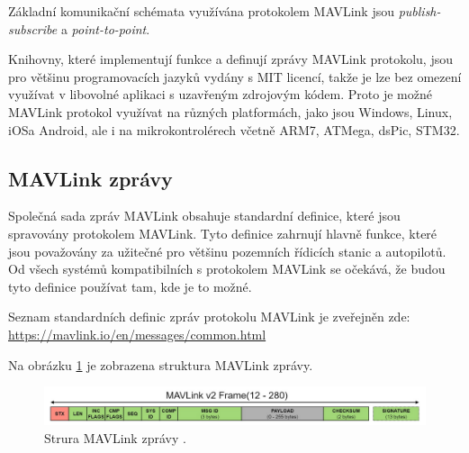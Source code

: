 Základní komunikační schémata využívána protokolem MAVLink jsou \textit{publish-subscribe} a \textit{point-to-point}.

Knihovny, které implementují funkce a definují zprávy MAVLink protokolu, jsou pro většinu programovacích jazyků vydány s MIT licencí, takže je lze bez omezení využívat v libovolné aplikaci s uzavřeným zdrojovým kódem. Proto je možné MAVLink protokol využívat na různých platformách, jako jsou Windows, Linux, iOS\break a Android, ale i na mikrokontrolérech včetně ARM7, ATMega, dsPic, STM32. \cite{MAVLINK}

\subsection{MAVLink zprávy}

Společná sada zpráv MAVLink obsahuje standardní definice, které jsou spravovány protokolem MAVLink. Tyto definice zahrnují hlavně funkce, které jsou považovány za užitečné pro většinu pozemních řídicích stanic a autopilotů. Od všech systémů kompatibilních s protokolem MAVLink se očekává, že budou tyto definice používat tam, kde je to možné.

Seznam standardních definic zpráv protokolu MAVLink je zveřejněn zde: \url{https://mavlink.io/en/messages/common.html}

Na obrázku \ref{fig:MAV1} je zobrazena struktura MAVLink zprávy.

\begin{figure}[!ht]
  \begin{center}
    \hspace*{-1cm}
    \includegraphics[scale=0.31]{obrazky/MAV1}
  \end{center}
  \caption[Strura MAVLink zprávy]{Strura MAVLink zprávy \cite{MAVLINK}.}
  \label{fig:MAV1}
\end{figure}

